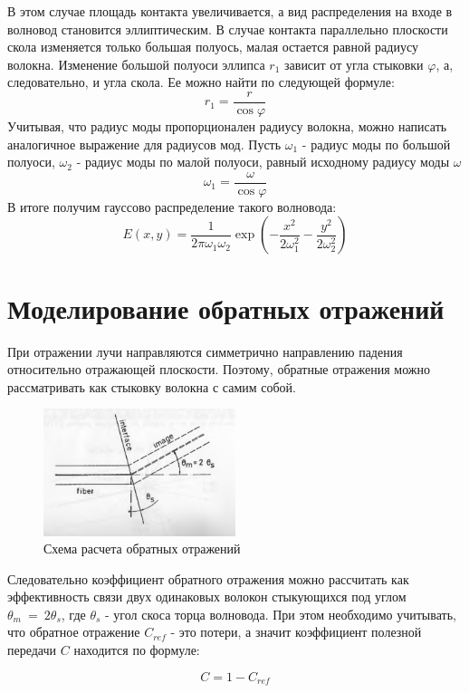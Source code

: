 В этом случае площадь контакта увеличивается, а вид распределения на входе в волновод становится эллиптическим. В случае контакта параллельно плоскости скола изменяется только большая полуось, малая остается равной радиусу волокна. Изменение большой полуоси эллипса $r_1$ зависит от угла стыковки $\varphi$, а, следовательно, и угла скола. Ее можно найти по следующей формуле:
\begin{equation}
	r_1 = \frac{r}{\cos \varphi}
\end{equation}
Учитывая, что радиус моды пропорционален радиусу волокна, можно написать аналогичное выражение для радиусов мод. Пусть $\omega_1$ - радиус моды по большой полуоси, $\omega_2$ - радиус моды по малой полуоси, равный исходному радиусу моды $\omega$
\begin{equation}
	\omega_1 = \frac{\omega}{\cos \varphi}
	\label{ellipse_axis}
\end{equation}
В итоге получим гауссово распределение такого волновода:
\begin{equation}
  E(x,y)=\frac{1}{2\pi\omega_1\omega_2}\exp\left(-\frac{x^2}{2\omega_1^2}-\frac{y^2}{2\omega_2^2}\right)
\end{equation}

\section{Моделирование обратных отражений}
\label{backreflection_method}
При отражении лучи направляются симметрично направлению падения относительно отражающей плоскости. Поэтому, обратные отражения можно рассматривать как стыковку волокна с самим собой.

\begin{figure}[h!]
	\includegraphics[width=0.5\textwidth]{img/backreflection_scheme.png}
	\caption{Схема расчета обратных отражений}
\end{figure}

Следовательно коэффициент обратного отражения можно рассчитать как эффективность связи двух одинаковых волокон стыкующихся под углом $\theta_m~=~2\theta_s$, где $\theta_s$ - угол скоса торца волновода. При этом необходимо учитывать, что обратное отражение $C_{ref}$ - это потери, а значит коэффициент полезной передачи $C$ находится по формуле:

\begin{equation}
	C = 1 - C_{ref}
\end{equation}
